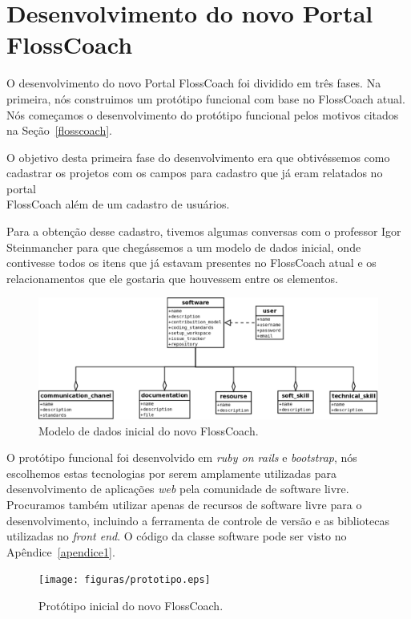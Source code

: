 \chapter{Desenvolvimento do novo Portal \\FlossCoach}
\label{desenvolvimento}

O desenvolvimento do novo Portal FlossCoach foi dividido em três fases. Na primeira, 
nós construimos um protótipo funcional com base no FlossCoach atual. Nós começamos o
desenvolvimento do protótipo funcional pelos motivos citados na Seção~\ref{flosscoach}.

O objetivo desta primeira fase do desenvolvimento era que obtivéssemos como cadastrar 
os projetos com os campos para cadastro que já eram relatados no portal \\FlossCoach 
além de um cadastro de usuários.

Para a obtenção desse cadastro, tivemos algumas conversas com o professor Igor Steinmancher
para que chegássemos a um modelo de dados inicial, onde contivesse todos os itens que 
já estavam presentes no FlossCoach atual e os relacionamentos que ele gostaria que 
houvessem entre os elementos.

\begin{figure}[h]
	\centering
	\label{fig:diagrama_iicial}
		\includegraphics[keepaspectratio=true,scale=0.35]{figuras/diagrama_inicial.eps}
	\caption{Modelo de dados inicial do novo FlossCoach.}
\end{figure}

O protótipo funcional foi desenvolvido em \textit{ruby on rails} e \textit{bootstrap},
nós escolhemos estas tecnologias por serem amplamente utilizadas para desenvolvimento
de aplicações \textit{web} pela comunidade de software livre. Procuramos também utilizar
apenas de recursos de software livre para o desenvolvimento, incluindo a ferramenta de 
controle de versão e as bibliotecas utilizadas no \textit{front end}. O código da classe
software pode ser visto no Apêndice~\ref{apendice1}.

\begin{figure}[h]
	\centering
	\label{fig:prototipo}
		\texttt{[image: figuras/prototipo.eps]}
	\caption{Protótipo inicial do novo FlossCoach.}
\end{figure}

